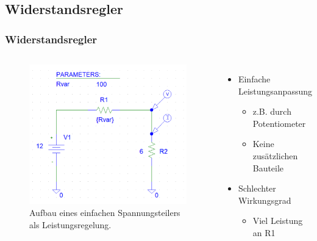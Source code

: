 \documentclass{beamer}
\begin{document}
	\subsection{Widerstandsregler}
	\begin{frame}
		\frametitle{Widerstandsregler}
		\begin{columns}
			\begin{figure}[tbh]
				\centering
				\includegraphics[width=1\linewidth]{medien/V1-0}
				\caption[Erster Aufbau]{Aufbau eines einfachen Spannungsteilers als Leistungsregelung.}
				\label{fig:aufbau1}
			\end{figure}
			\begin{itemize}
				\item{Einfache Leistungsanpassung}
				\begin{itemize}
					\item{z.B. durch Potentiometer}
					\item{Keine zusätzlichen Bauteile}
				\end{itemize}
				\item{Schlechter Wirkungsgrad}
				\begin{itemize}
					\item{Viel Leistung an R1}
				\end{itemize}
			\end{itemize}
		\end{columns}
	\end{frame}
\end{document}
